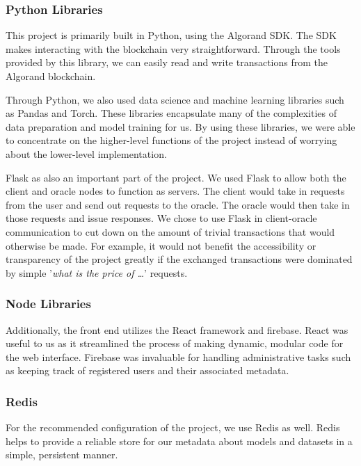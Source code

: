 \documentclass{article}
\begin{document}
    \subsubsection*{Python Libraries}
    
    This project is primarily built in Python, using the Algorand SDK.  The SDK makes interacting with the blockchain
    very straightforward.  Through the tools provided by this library, we can easily read and write transactions from
    the Algorand blockchain.

    Through Python, we also used data science and machine learning libraries such as Pandas
    and Torch.  These libraries encapsulate many of the complexities of data preparation and model training for us.
    By using these libraries, we were able to concentrate on the higher-level functions of the project instead of worrying
    about the lower-level implementation.

    Flask as also an important part of the project.  We used Flask to allow both
    the client and oracle nodes to function as servers.  The client would take in requests from the user and send out
    requests to the oracle.  The oracle would then take in those requests and issue responses.  We chose to use Flask in
    client-oracle communication to cut down on the amount of trivial transactions that would otherwise be made.  For example,
    it would not benefit the accessibility or transparency of the project greatly if the exchanged transactions were
    dominated by simple '\textit{what is the price of \ldots}' requests.
    
    \subsubsection*{Node Libraries}

    Additionally, the front end utilizes the React framework and firebase.  React was useful to us as it streamlined the process of making
    dynamic, modular code for the web interface.  Firebase was invaluable for handling administrative tasks such as keeping
    track of registered users and their associated metadata.
    
    \subsubsection*{Redis}

    For the recommended configuration of the project, we use Redis as well.  Redis helps to provide a reliable store for
    our metadata about models and datasets in a simple, persistent manner.
\end{document}
